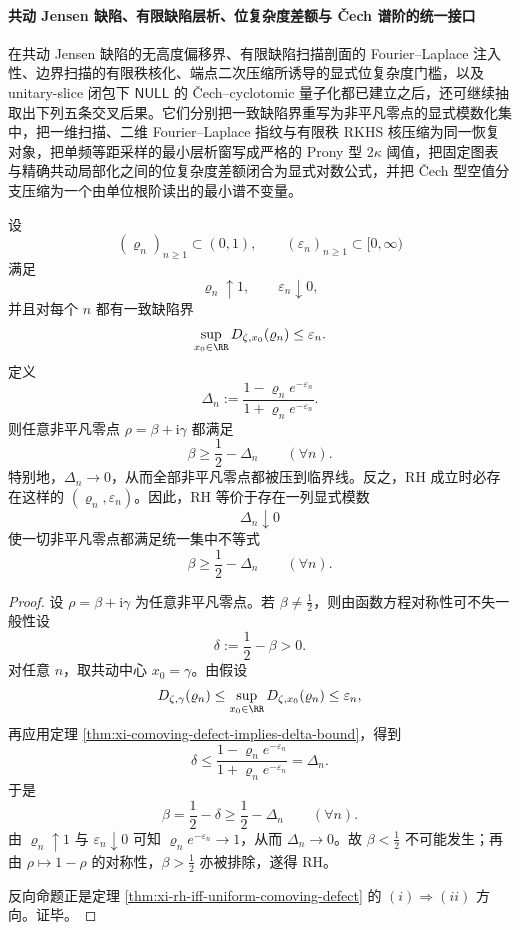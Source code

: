 \paragraph{共动 Jensen 缺陷、有限缺陷层析、位复杂度差额与 \texorpdfstring{\v{C}ech}{Cech} 谱阶的统一接口}
在共动 Jensen 缺陷的无高度偏移界、有限缺陷扫描剖面的 Fourier--Laplace 注入性、边界扫描的有限秩核化、端点二次压缩所诱导的显式位复杂度门槛，以及 unitary-slice 闭包下 \(\mathsf{NULL}\) 的 \v{C}ech--cyclotomic 量子化都已建立之后，还可继续抽取出下列五条交叉后果。它们分别把一致缺陷界重写为非平凡零点的显式模数化集中，把一维扫描、二维 Fourier--Laplace 指纹与有限秩 RKHS 核压缩为同一恢复对象，把单频等距采样的最小层析窗写成严格的 Prony 型 \(2\kappa\) 阈值，把固定图表与精确共动局部化之间的位复杂度差额闭合为显式对数公式，并把 \v{C}ech 型空值分支压缩为一个由单位根阶读出的最小谱不变量。

\begin{theorem}[临界线集中的显式模数化判别]\label{thm:xi-time-part9xd-explicit-critical-line-concentration-modulus}
设
\[
(\varrho_n)_{n\ge 1}\subset(0,1),
\qquad
(\varepsilon_n)_{n\ge 1}\subset[0,\infty)
\]
满足
\[
\varrho_n\uparrow 1,
\qquad
\varepsilon_n\downarrow 0,
\]
并且对每个 \(n\) 都有一致缺陷界
\[
\sup_{x_0\in\RR}D_{\zeta,x_0}(\varrho_n)\le \varepsilon_n.
\]
定义
\[
\Delta_n:=\frac{1-\varrho_n e^{-\varepsilon_n}}{1+\varrho_n e^{-\varepsilon_n}}.
\]
则任意非平凡零点 \(\rho=\beta+\mathrm{i}\gamma\) 都满足
\[
\beta\ge \frac12-\Delta_n
\qquad (\forall n).
\]
特别地，\(\Delta_n\to 0\)，从而全部非平凡零点都被压到临界线。反之，RH 成立时必存在这样的 \((\varrho_n,\varepsilon_n)\)。因此，RH 等价于存在一列显式模数
\[
\Delta_n\downarrow 0
\]
使一切非平凡零点都满足统一集中不等式
\[
\beta\ge \frac12-\Delta_n
\qquad (\forall n).
\]
\end{theorem}

\begin{proof}
设 \(\rho=\beta+\mathrm{i}\gamma\) 为任意非平凡零点。若 \(\beta\neq \frac12\)，则由函数方程对称性可不失一般性设
\[
\delta:=\frac12-\beta>0.
\]
对任意 \(n\)，取共动中心 \(x_0=\gamma\)。由假设
\[
D_{\zeta,\gamma}(\varrho_n)\le \sup_{x_0\in\RR}D_{\zeta,x_0}(\varrho_n)\le \varepsilon_n,
\]
再应用定理 \ref{thm:xi-comoving-defect-implies-delta-bound}，得到
\[
\delta\le \frac{1-\varrho_n e^{-\varepsilon_n}}{1+\varrho_n e^{-\varepsilon_n}}=\Delta_n.
\]
于是
\[
\beta=\frac12-\delta\ge \frac12-\Delta_n
\qquad (\forall n).
\]
由 \(\varrho_n\uparrow 1\) 与 \(\varepsilon_n\downarrow 0\) 可知 \(\varrho_n e^{-\varepsilon_n}\to 1\)，从而 \(\Delta_n\to 0\)。故 \(\beta<\frac12\) 不可能发生；再由 \(\rho\mapsto 1-\rho\) 的对称性，\(\beta>\frac12\) 亦被排除，遂得 RH。

反向命题正是定理 \ref{thm:xi-rh-iff-uniform-comoving-defect} 的 \((i)\Rightarrow(ii)\) 方向。证毕。
\end{proof}

